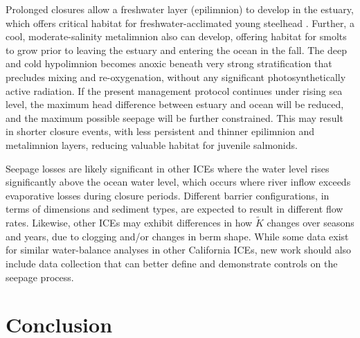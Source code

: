 \documentclass[preprint,12pt,authoryear]{elsarticle}
\makeatletter
\providecommand{\DIFaddtex}[1]{{\protect\color{blue}\uwave{#1}}} %
\providecommand{\DIFdeltex}[1]{{\protect\color{red}\sout{#1}}} %
\providecommand{\DIFaddbegin}{} %
\providecommand{\DIFaddend}{} %
\providecommand{\DIFdelbegin}{} %
\providecommand{\DIFdelend}{} %
\providecommand{\DIFadd}[1]{\texorpdfstring{\DIFaddtex{#1}}{#1}} %
\providecommand{\DIFdel}[1]{\texorpdfstring{\DIFdeltex{#1}}{}} %
\newcommand{\DIFscaledelfig}{0.5}
\newlength{\DIFdelgraphicswidth} %
\newlength{\DIFdelgraphicsheight} %
\newcommand{\DIFaddincludegraphics}[2][]{{\color{blue}\fbox{\DIFOincludegraphics[#1]{#2}}}} %
\newcommand{\DIFdelincludegraphics}[2][]{%
\sbox{\DIFdelgraphicsbox}{\DIFOincludegraphics[#1]{#2}}%
\settoboxwidth{\DIFdelgraphicswidth}{\DIFdelgraphicsbox} %
\settoboxtotalheight{\DIFdelgraphicsheight}{\DIFdelgraphicsbox} %
\scalebox{\DIFscaledelfig}{%
\parbox[b]{\DIFdelgraphicswidth}{\usebox{\DIFdelgraphicsbox}\\[-\baselineskip] \rule{\DIFdelgraphicswidth}{0em}}\llap{\resizebox{\DIFdelgraphicswidth}{\DIFdelgraphicsheight}{%
\setlength{\unitlength}{\DIFdelgraphicswidth}%
\begin{picture}(1,1)%
\thicklines\linethickness{2pt} %
{\color[rgb]{1,0,0}\put(0,0){\framebox(1,1){}}}%
{\color[rgb]{1,0,0}\put(0,0){\line( 1,1){1}}}%
{\color[rgb]{1,0,0}\put(0,1){\line(1,-1){1}}}%
\end{picture}%
}\hspace*{3pt}}} %
} %
\DeclareRobustCommand{\DIFaddbegin}{\DIFOaddbegin \let\includegraphics\DIFaddincludegraphics} %
\DeclareRobustCommand{\DIFaddend}{\DIFOaddend \let\includegraphics\DIFOincludegraphics} %
\DeclareRobustCommand{\DIFdelbegin}{\DIFOdelbegin \let\includegraphics\DIFdelincludegraphics} %
\DeclareRobustCommand{\DIFdelend}{\DIFOaddend \let\includegraphics\DIFOincludegraphics} %
\let\sout@orig\sout %
\renewcommand{\sout}[1]{\ifmmode\text{\sout@orig{\ensuremath{#1}}}\else\sout@orig{#1}\fi} %
\makeatother
\begin{document}
Prolonged closures allow a freshwater layer (epilimnion) to develop in the estuary, which offers critical habitat for freshwater-acclimated young steelhead \citep{largier20205}. Further, a cool, moderate-salinity metalimnion also can develop, offering habitat for smolts to grow prior to leaving the estuary and entering the ocean in the fall. The deep and cold hypolimnion becomes anoxic beneath very strong stratification that precludes mixing and re-oxygenation, without any significant photosynthetically active radiation. If the present management protocol continues under rising sea level, the maximum head difference between estuary and ocean will be reduced, and the maximum possible seepage will be further constrained.  This may result in shorter closure events, with less persistent and thinner epilimnion and metalimnion layers, reducing valuable habitat for juvenile salmonids.  


 Seepage losses are likely significant in other ICEs where the water level rises significantly above the ocean water level, which occurs where river inflow exceeds evaporative losses during closure periods.  Different barrier configurations, in terms of dimensions and sediment types, are expected to result in different flow rates.  Likewise, other ICEs may exhibit differences in how \DIFdelbegin \DIFdel{$\tilde K$ }\DIFdelend \DIFaddbegin \DIFadd{$C$ }\DIFaddend changes over seasons and years, due to clogging and/or changes in berm shape. While some data exist for similar water-balance analyses in other California ICEs, new work should also include data collection that can better define and demonstrate controls on the seepage process.

\label{sec:discussion}

\section{Conclusion}
\end{document}
